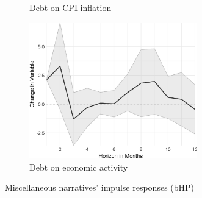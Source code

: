 \begin{figure}
\begin{subfigure}{00.24\textwidth}
		\caption{Debt on CPI inflation}
	\end{subfigure}
	\begin{subfigure}{00.24\textwidth}
		\includegraphics[width=0.8\textwidth]{output/lp/baseline/bHP/debt/debtoneconac_djn.eps}
		\caption{Debt on economic activity}
	\end{subfigure}
	\caption{Miscellaneous narratives' impulse responses (bHP)}
	\label{fig:irf_3}
\end{figure}
